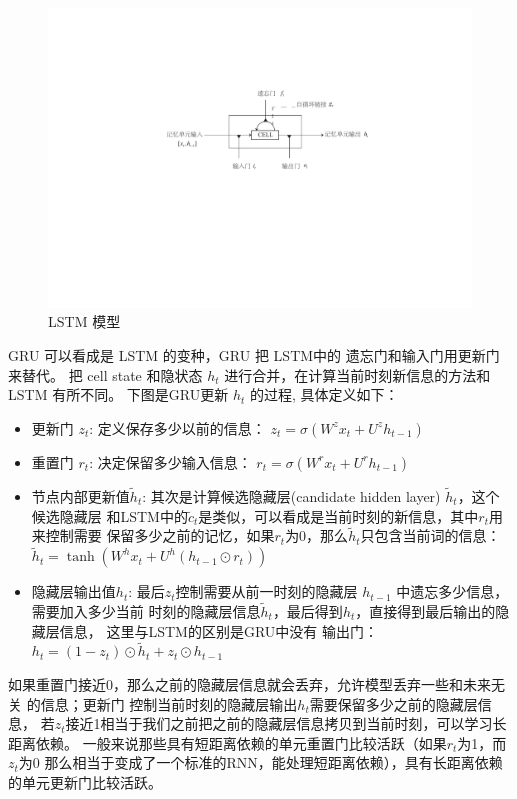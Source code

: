 \documentclass[master,openright,twoside,color]{buaathesis}
\begin{document}
\begin{figure}
  \centering
  \includegraphics[width=0.7\linewidth]{./figures/lstm.pdf}
  \caption{LSTM 模型}\label{fig:lstm}
\end{figure}


GRU 可以看成是 LSTM 的变种，GRU 把 LSTM中的 遗忘门和输入门用更新门来替代。 把 cell state 和隐状态 $h_t$ 进行合并，在计算当前时刻新信息的方法和 LSTM 有所不同。 下图是GRU更新 $h_t$ 的过程, 具体定义如下：
\begin{itemize}
\item 更新门 $z_t$: 定义保存多少以前的信息： $z_t = \sigma ( W^z x_t+ U^z h_{t-1}  )$

\item 重置门 $r_t$: 决定保留多少输入信息： $r_t = \sigma(W^r x_t  + U^r h_{t-1}  )$

\item 节点内部更新值$\tilde h_t $: 其次是计算候选隐藏层(candidate hidden layer) $\tilde h_t$，这个候选隐藏层 和LSTM中的$\tilde c_t$是类似，可以看成是当前时刻的新信息，其中$r_t$用来控制需要 保留多少之前的记忆，如果$r_t$为0，那么$\tilde h_t$只包含当前词的信息：$\tilde h_t  = \tanh (W^h x_t  + U^h(h_{t-1} \odot r_t) )$

\item 隐藏层输出值$h_t$: 最后$z_t$控制需要从前一时刻的隐藏层 $h_{t-1}$ 中遗忘多少信息，需要加入多少当前 时刻的隐藏层信息$\tilde h_t$，最后得到$h_t$，直接得到最后输出的隐藏层信息， 这里与LSTM的区别是GRU中没有 输出门：$h_t = (1-z_t)\odot \tilde h_t  + z_t \odot h_{t-1}$
\end{itemize}
如果重置门接近0，那么之前的隐藏层信息就会丢弃，允许模型丢弃一些和未来无关 的信息；更新门 控制当前时刻的隐藏层输出$h_t$需要保留多少之前的隐藏层信息， 若$z_t$接近1相当于我们之前把之前的隐藏层信息拷贝到当前时刻，可以学习长距离依赖。 一般来说那些具有短距离依赖的单元重置门比较活跃（如果$r_t$为1，而$z_t$为$0$ 那么相当于变成了一个标准的RNN，能处理短距离依赖），具有长距离依赖的单元更新门比较活跃。
\end{document}
